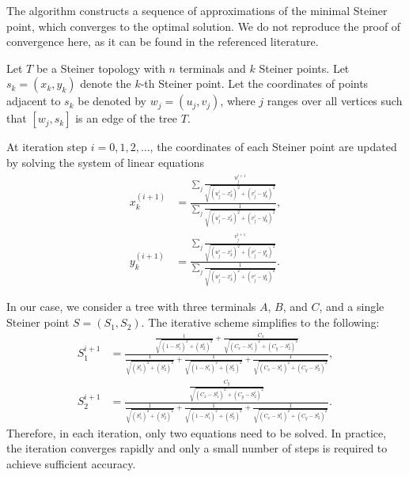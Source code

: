 \documentclass[openany]{book}
\begin{document}
	The algorithm constructs a sequence of approximations of the minimal Steiner point, which converges to the optimal solution. We do not reproduce the proof of convergence here, as it can be found in the referenced literature.
	\begin{algorithm}[H]
		\caption{Smith's Numerical Method}
		\label{alg:smith}
		Let $T$ be a Steiner topology with $n$ terminals and $k$ Steiner points.  
		Let $s_k = (x_k, y_k)$ denote the $k$-th Steiner point.  
		Let the coordinates of points adjacent to $s_k$ be denoted by $w_j = (u_j, v_j)$, where $j$ ranges over all vertices such that $[w_j, s_k]$ is an edge of the tree $T$.
		
		At iteration step $i = 0,1,2,\dots$, the coordinates of each Steiner point are updated by solving the system of linear equations
		\begin{align}
			x_k^{(i+1)} &= 
			\frac{\displaystyle \sum_j \frac{u^{i+1}_j}{\sqrt{(u^{i}_j - x_k^{i})^2 + (v^{i}_j - y_k^{i})^2}}}
			{\displaystyle \sum_j \frac{1}{\sqrt{(u^{i}_j - x_k^{i})^2 + (v^{i}_j - y_k^{i})^2}}}, \\[0.8em]
			y_k^{(i+1)} &= 
			\frac{\displaystyle \sum_j \frac{v^{i+1}_j}{\sqrt{(u^{i}_j - x_k^{i})^2 + (v^{i}_j - y_k^{i})^2}}}
			{\displaystyle \sum_j \frac{1}{\sqrt{(u^{i}_j - x_k^{i})^2 + (v^{i}_j - y_k^{i})^2}}}.
		\end{align}
	\end{algorithm}

	In our case, we consider a tree with three terminals $A$, $B$, and $C$, and a single Steiner point $S = (S_1, S_2)$. The iterative scheme simplifies to the following:
	\begin{align}
		S^{i+1}_1 &=
		\frac{
			\frac{1}{\sqrt{(1 - S^{i}_1)^2 + (S^{i}_2)^2}}
			+
			\frac{C_x}{\sqrt{(C_x - S^{i}_1)^2 + (C_y - S^{i}_2)^2}}
		}{
			\frac{1}{\sqrt{(S^{i}_1)^2 + (S^{i}_2)^2}}
			+
			\frac{1}{\sqrt{(1 - S^{i}_1)^2 + (S^{i}_2)^2}}
			+
			\frac{1}{\sqrt{(C_x - S^{i}_1)^2 + (C_y - S^{i}_2)^2}}
		}, \\[0.7em]
		S^{i+1}_2 &=
		\frac{
			\frac{C_y}{\sqrt{(C_x - S^{i}_1)^2 + (C_y - S^{i}_2)^2}}
		}{
			\frac{1}{\sqrt{(S^{i}_1)^2 + (S^{i}_2)^2}}
			+
			\frac{1}{\sqrt{(1 - S^{i}_1)^2 + (S^{i}_2)^2}}
			+
			\frac{1}{\sqrt{(C_x - S^{i}_1)^2 + (C_y - S^{i}_2)^2}}
		}.
	\end{align}
		Therefore, in each iteration, only two equations need to be solved.	In practice, the iteration converges rapidly and only a small number of steps is required to achieve sufficient accuracy.
		
\end{document}
